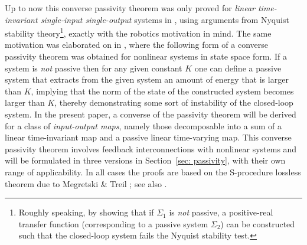 \documentclass[11pt]{article}
\begin{document}
Up to now this converse passivity theorem was only proved for {\it linear time-invariant single-input single-output} systems in \cite{colgate-hogan},
using arguments from Nyquist stability theory\footnote{Roughly speaking, by showing that if $\Sigma_1$ is {\it not} passive, a positive-real transfer
  function (corresponding to a passive system $\Sigma_2$) can be constructed such that the closed-loop system fails the Nyquist stability test.},
exactly with the robotics motivation in mind. The same motivation was elaborated on in \cite{Str15}, where the following form of a converse passivity
theorem was obtained for nonlinear systems in state space form. If a system is {\it not} passive then for any given constant $K$ one can define a
passive system that extracts from the given system an amount of energy that is larger than $K$, implying that the norm of the state of the constructed
system becomes larger than $K$, thereby demonstrating some sort of instability of the closed-loop system.
In the present paper, a converse of the passivity theorem will be derived for a class of {\it input-output maps}, namely those decomposable
into a sum of a linear time-invariant map and a passive linear time-varying map. This converse passivity theorem involves feedback interconnections
with nonlinear systems and will be formulated in three versions in Section~\ref{sec: passivity}, with their own range of applicability. In all cases
the proofs are based on the S-procedure lossless theorem due to Megretski \& Treil \cite{MegTre93}; see also \cite[Thm. 7]{Jon01}.
\end{document}
